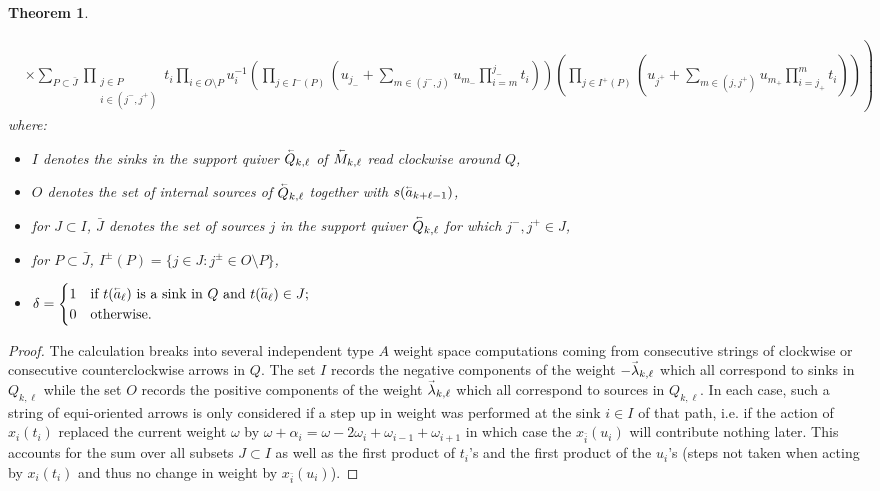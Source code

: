 \documentclass[11pt]{amsart}
\renewcommand{\vec}[1]{\accentset{\shortrightarrow}{#1}}
\newcommand{\cev}[1]{\accentset{\shortleftarrow}{#1}}
\newtheorem{theorem}{Theorem}[section]
\numberwithin{equation}{section}
\begin{document}
{\begin{theorem}
\begin{enumerate}
\begin{align}
        \nonumber&\times\left.\sum_{P\subset\bar{J}}\prod_{\substack{j\in P\\i\in(j^-,j^+)}}t_i\prod_{i\in O\setminus P}u_i^{-1}\left(\prod_{j\in I^-(P)}\left(u_{j_-}+\sum_{m\in(j^-,j)}u_{m_-}\prod_{i=m}^{j_-}t_i\right)\right)\left(\prod_{j\in I^+(P)}\left(u_{j^+}+\sum_{m\in(j,j^+)}u_{m_+}\prod_{i=j_+}^m t_i\right)\right)\right)
      \end{align}
      where:
      \begin{itemize}
        \item $I$ denotes the sinks in the support quiver $\cev{Q}_{k,\ell}$ of $\cev{M}_{k,\ell}$ read clockwise around $Q$,
        \item $O$ denotes the set of internal sources of $\cev{Q}_{k,\ell}$ together with $s(\cev{a}_{k+\ell-1})$,
        \item for $J\subset I$, $\bar{J}$ denotes the set of sources $j$ in the support quiver $\cev{Q}_{k,\ell}$ for which $j^-,j^+\in J$,
        \item for $P\subset\bar{J}$, $I^\pm(P)=\{j\in J:j^\pm\in O\setminus P\}$,
        \item $\delta=\begin{cases}1 & \text{if $t(\cev{a}_\ell)$ is a sink in $Q$ and $t(\cev{a}_\ell)\in J$;}\\0 & \text{otherwise.}\end{cases}$
      \end{itemize}
    \end{enumerate}
  \end{theorem}
  \begin{proof}
    The calculation breaks into several independent type $A$ weight space computations coming from consecutive strings of clockwise or consecutive counterclockwise arrows in $Q$.  The set $I$ records the negative components of the weight $-\vec{\lambda}_{k,\ell}$ which all correspond to sinks in $Q_{k,\ell}$ while the set $O$ records the positive components of the weight $\vec{\lambda}_{k,\ell}$ which all correspond to sources in $Q_{k,\ell}$.  In each case, such a string of equi-oriented arrows is only considered if a step up in weight was performed at the sink $i\in I$ of that path, i.e. if the action of $x_i(t_i)$ replaced the current weight $\omega$ by $\omega+\alpha_i=\omega-2\omega_i+\omega_{i-1}+\omega_{i+1}$ in which case the $x_{\bar{i}}(u_i)$ will contribute nothing later.  This accounts for the sum over all subsets $J\subset I$ as well as the first product of $t_i$'s and the first product of the $u_i$'s (steps not taken when acting by $x_i(t_i)$ and thus no change in weight by $x_{\bar{i}}(u_i)$).


\end{proof}}
\end{document}
